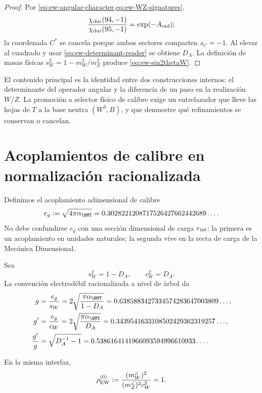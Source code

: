 \begin{proof}
Por \cref{eq:ew-angular-character,eq:ew-WZ-signatures},
\[
\frac{\chi_{\rm dur}(94,-1)}{\chi_{\rm dur}(95,-1)}
=\exp(-A_{\rm rad});
\]
la coordenada \(C^*\) se cancela porque ambos sectores comparten
\(s_C=-1\). Al elevar al cuadrado y usar
\cref{eq:ew-determinant-reader} se obtiene \(D_A\). La definici\'on
de masas f\'isicas \(s_W^2=1-m_W^2/m_Z^2\) produce
\cref{eq:ew-sin2thetaW}.
\end{proof}

El contenido principal es la identidad entre dos construcciones
internos: el determinante del operador angular y la diferencia de un paso
en la realizaci\'on \(W/Z\). La promoci\'on a selector f\'isico de calibre exige
un entrelazador que lleve las hojas de \(T\) a la base neutra
\((W^3,B)\), y que demuestre qu\'e refinamientos se conservan o cancelan.

\section{Acoplamientos de calibre en normalizaci\'on racionalizada}

Definimos el acoplamiento adimensional de calibre
\begin{equation}
\label{eq:ew-egauge}
e_g:=\sqrt{4\pi\alpha_{\HMT}}
=0.3028221208717526427662442689\ldots .
\end{equation}
No debe confundirse \(e_g\) con una secci\'on dimensional de carga
\(e_{\rm int}\): la primera es un acoplamiento en unidades naturales; la
segunda vive en la recta de carga de la Mec\'anica Dimensional.

Sea
\begin{equation}
\label{eq:ew-sw-cw}
s_W^2=1-D_A,
\qquad
c_W^2=D_A.
\end{equation}
La convenci\'on electrod\'ebil racionalizada a nivel de \`arbol da
\begin{align}
g&=\frac{e_g}{s_W}
=2\sqrt{\frac{\pi\alpha_{\HMT}}{1-D_A}}
=0.6385883427334574283647003809\ldots,
\label{eq:ew-g}\\
g'&=\frac{e_g}{c_W}
=2\sqrt{\frac{\pi\alpha_{\HMT}}{D_A}}
=0.3439541633108502429362319257\ldots,
\label{eq:ew-gprime}\\
\frac{g'}{g}
&=\sqrt{D_A^{-1}-1}
=0.5386164141966093594996610933\ldots .
\label{eq:ew-gprime-over-g}
\end{align}

\begin{proposition}
\label{prop:ew-rho}
En la misma interfaz,
\begin{equation}
\label{eq:ew-rho}
\rho_{\rm EW}^{(0)}
:=\frac{(m_W^{\angle})^2}
{(m_Z^{\angle})^2c_W^2}=1.
\end{equation}
\end{proposition}

